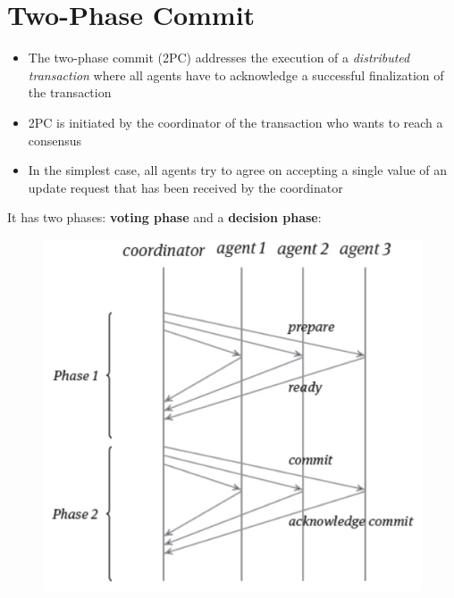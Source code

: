 \section{Two-Phase Commit}
\begin{itemize}
    \item The two-phase commit (2PC) addresses the execution of a \textit{distributed transaction} where all agents have to acknowledge a successful finalization of the transaction
    \item 2PC is initiated by the coordinator of the transaction who wants to reach a consensus
    \item In the simplest case, all agents try to agree on accepting a single value of an update request that has been received by the coordinator
\end{itemize}
\newpage
It has two phases: \textbf{voting phase} and a \textbf{decision phase}:
\begin{figure}[h!]
\centering
\includegraphics[width=.5\linewidth]{images/AdvancedDataManagment/distribute_concurrency_control/2pc-commit_case.jpeg}
\end{figure}

